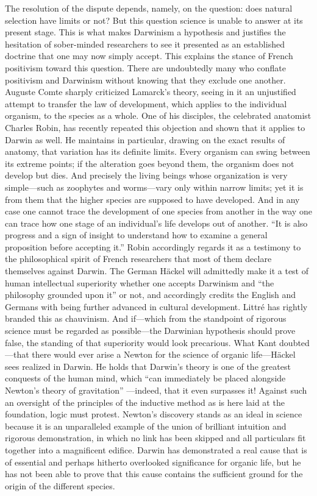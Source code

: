 \documentclass[12pt,a4paper]{article}
\begin{document}
The resolution of the dispute depends, namely, on the question: does
natural selection have limits or not? But this question science is
unable to answer at its present stage. This is what makes Darwinism a
hypothesis and justifies the hesitation of sober-minded researchers to
see it presented as an established doctrine that one may now simply
accept. This explains the stance of French positivism toward this
question. There are undoubtedly many who conflate positivism and
Darwinism without knowing that they exclude one another. Auguste Comte
sharply criticized Lamarck's theory, seeing in it an unjustified
attempt to transfer the law of development, which applies to the
individual organism, to the species as a whole. One of his disciples,
the celebrated anatomist Charles Robin, has recently repeated this
objection and shown that it applies to Darwin as well. He maintains in
particular, drawing on the exact results of anatomy, that variation
has its definite limits. Every organism can swing between its extreme
points; if the alteration goes beyond them, the organism does not
develop but dies. And precisely the living beings whose organization
is very simple---such as zoophytes and worms---vary only within narrow
limits; yet it is from them that the higher species are supposed to
have developed. And in any case one cannot trace the development of
one species from another in the way one can trace how one stage of an
individual's life develops out of another. ``It is also progress and
a sign of insight to understand how to examine a general proposition
before accepting it.'' Robin accordingly regards it as a testimony to
the philosophical spirit of French researchers that most of them
declare themselves against Darwin. The German Häckel will admittedly
make it a test of human intellectual superiority whether one accepts
Darwinism and ``the philosophy grounded upon it'' or not, and
accordingly credits the English and Germans with being further advanced
in cultural development. Littré has rightly branded this as
chauvinism. And if---which from the standpoint of rigorous science
must be regarded as possible---the Darwinian hypothesis should prove
false, the standing of that superiority would look precarious. What
Kant doubted---that there would ever arise a Newton for the science of
organic life---Häckel sees realized in Darwin. He holds that Darwin's
theory is one of the greatest conquests of the human mind, which
``can immediately be placed alongside Newton's theory of gravitation''
---indeed, that it even surpasses it! Against such an oversight of the
principles of the inductive method as is here laid at the foundation,
logic must protest. Newton's discovery stands as an ideal in science
because it is an unparalleled example of the union of brilliant
intuition and rigorous demonstration, in which no link has been
skipped and all particulars fit together into a magnificent edifice.
Darwin has demonstrated a real cause that is of essential and perhaps
hitherto overlooked significance for organic life, but he has not been
able to prove that this cause contains the sufficient ground for the
origin of the different species.
\end{document}
